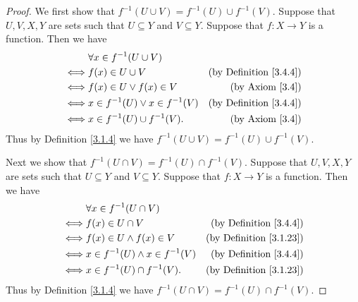 \begin{proof}
    We first show that \(f^{-1}(U \cup V) = f^{-1}(U) \cup f^{-1}(V)\).
    Suppose that \(U, V, X, Y\) are sets such that \(U \subseteq Y\) and \(V \subseteq Y\).
    Suppose that \(f : X \to Y\) is a function.
    Then we have
    \begin{align*}
             & \forall x \in f^{-1}(U \cup V)                                            \\
        \iff & f(x) \in U \cup V                    & \text{(by Definition \ref{3.4.4})} \\
        \iff & f(x) \in U \lor f(x) \in V           & \text{(by Axiom \ref{3.4})}        \\
        \iff & x \in f^{-1}(U) \lor x \in f^{-1}(V) & \text{(by Definition \ref{3.4.4})} \\
        \iff & x \in f^{-1}(U) \cup f^{-1}(V).      & \text{(by Axiom \ref{3.4})}
    \end{align*}
    Thus by Definition \ref{3.1.4} we have \(f^{-1}(U \cup V) = f^{-1}(U) \cup f^{-1}(V)\).

    Next we show that \(f^{-1}(U \cap V) = f^{-1}(U) \cap f^{-1}(V)\).
    Suppose that \(U, V, X, Y\) are sets such that \(U \subseteq Y\) and \(V \subseteq Y\).
    Suppose that \(f : X \to Y\) is a function.
    Then we have
    \begin{align*}
             & \forall x \in f^{-1}(U \cap V)                                              \\
        \iff & f(x) \in U \cap V                     & \text{(by Definition \ref{3.4.4})}  \\
        \iff & f(x) \in U \land f(x) \in V           & \text{(by Definition \ref{3.1.23})} \\
        \iff & x \in f^{-1}(U) \land x \in f^{-1}(V) & \text{(by Definition \ref{3.4.4})}  \\
        \iff & x \in f^{-1}(U) \cap f^{-1}(V).       & \text{(by Definition \ref{3.1.23})}
    \end{align*}
    Thus by Definition \ref{3.1.4} we have \(f^{-1}(U \cap V) = f^{-1}(U) \cap f^{-1}(V)\).


\end{proof}
